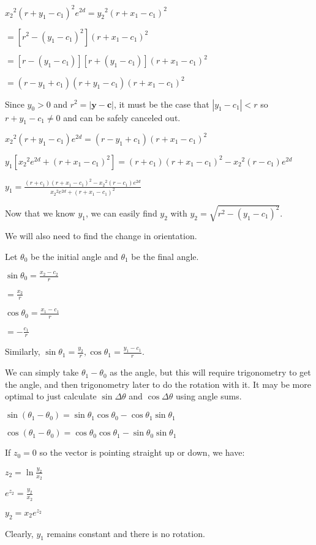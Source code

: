 \documentclass[12pt]{amsart}
\begin{document}
${x_2}^2(r+y_1-c_1)^2e^{2d} = {y_2}^2(r+x_1-c_1)^2$

$= [r^2-(y_1-c_1)^2](r+x_1-c_1)^2$

$= [r-(y_1-c_1)][r+(y_1-c_1)](r+x_1-c_1)^2$

$= (r-y_1+c_1)(r+y_1-c_1)(r+x_1-c_1)^2$

Since $y_0 > 0$ and $r^2 = |\textbf{y}-\textbf{c}|$, it must be the case that $|y_1-c_1| < r$ so $r+y_1-c_1 \neq 0$ and can be safely canceled out.

${x_2}^2(r+y_1-c_1)e^{2d} = (r-y_1+c_1)(r+x_1-c_1)^2$

$y_1[{x_2}^2e^{2d}+(r+x_1-c_1)^2] = (r+c_1)(r+x_1-c_1)^2-{x_2}^2(r-c_1)e^{2d}$

$y_1 = \frac{(r+c_1)(r+x_1-c_1)^2-{x_2}^2(r-c_1)e^{2d}}{{x_2}^2e^{2d}+(r+x_1-c_1)^2}$

Now that we know $y_1$, we can easily find $y_2$ with $y_2 = \sqrt{r^2-({y_1}-c_1)^2}$.

We will also need to find the change in orientation.

Let $\theta_0$ be the initial angle and $\theta_1$ be the final angle.

$\sin \theta_0 = \frac{x_2-c_2}{r}$

$= \frac{x_2}{r}$

$\cos \theta_0 = \frac{x_1-c_1}{r}$

$= -\frac{c_1}{r}$

Similarly, $\sin \theta_1 = \frac{y_2}{r}, \cos \theta_1 = \frac{y_1-c_1}{r}$.

We can simply take $\theta_1-\theta_0$ as the angle, but this will require trigonometry to get the angle, and then trigonometry later to do the rotation with it. It may be more optimal to just calculate $\sin \Delta\theta$ and $\cos \Delta\theta$ using angle sums.

$\sin(\theta_1-\theta_0) = \sin\theta_1 \cos\theta_0 - \cos\theta_1 \sin\theta_1$

$\cos(\theta_1-\theta_0) = \cos\theta_0 \cos\theta_1 - \sin\theta_0 \sin\theta_1$

If $z_0 = 0$ so the vector is pointing straight up or down, we have:

$z_2 = \ln\frac{y_2}{x_2}$

$e^{z_2} = \frac{y_2}{x_2}$

$y_2 = x_2e^{z_2}$

Clearly, $y_1$ remains constant and there is no rotation.
\end{document}
